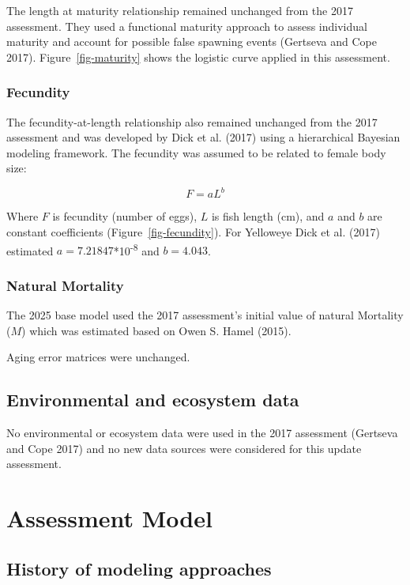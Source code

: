 \documentclass[
]{scrartcl}
\begin{document}
The length at maturity relationship remained unchanged from the 2017
assessment. They used a functional maturity approach to assess
individual maturity and account for possible false spawning events
(Gertseva and Cope 2017). Figure~\ref{fig-maturity} shows the logistic
curve applied in this assessment.

\subsubsection{Fecundity}\label{fecundity}

The fecundity-at-length relationship also remained unchanged from the
2017 assessment and was developed by Dick et al. (2017) using a
hierarchical Bayesian modeling framework. The fecundity was assumed to
be related to female body size:

\[
F = aL^b
\]

Where \(F\) is fecundity (number of eggs), \(L\) is fish length (cm),
and \(a\) and \(b\) are constant coefficients
(Figure~\ref{fig-fecundity}). For Yelloweye Dick et al. (2017) estimated
\(a = 7.21847\)*10\textsuperscript{-8} and \(b = 4.043\).

\subsubsection{Natural Mortality}\label{natural-mortality}

The 2025 base model used the 2017 assessment's initial value of natural
Mortality (\(M\)) which was estimated based on Owen S. Hamel (2015).

Aging error matrices were unchanged.

\subsection{Environmental and ecosystem
data}\label{environmental-and-ecosystem-data}

No environmental or ecosystem data were used in the 2017 assessment
(Gertseva and Cope 2017) and no new data sources were considered for
this update assessment.

\newpage{}

\section{Assessment Model}\label{assessment-model}

\subsection{History of modeling
approaches}\label{history-of-modeling-approaches}
\end{document}
